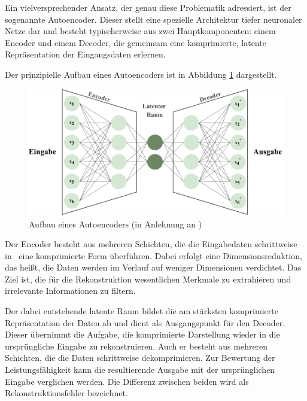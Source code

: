 Ein vielversprechender Ansatz, der genau diese Problematik adressiert, ist der sogenannte Autoencoder. 
Dieser stellt eine spezielle Architektur tiefer neuronaler Netze dar und besteht typischerweise aus zwei Hauptkomponenten: einem Encoder und einem Decoder, die gemeinsam eine komprimierte, latente Repräsentation der Eingangsdaten erlernen.
\cite{Lempitsky2019}

Der prinzipielle Aufbau eines Autoencoders ist in Abbildung \ref{fig:Autoencoder} dargestellt.

\begin{figure}[htbp]
    \centering
    \includegraphics[width=1\textwidth]{Bilder/Autoencoder/AutoencoderModell.pdf}
    \caption[Aufbau eines Autoencoders]{Aufbau eines Autoencoders (in Anlehnung an \cite{AutoencoderBild})}
    \label{fig:Autoencoder}
\end{figure}

\vspace{-0.75em}
Der Encoder besteht aus mehreren Schichten, die die Eingabedaten schrittweise in%
\pagebreak
~eine komprimierte Form überführen. 
Dabei erfolgt eine Dimensionsreduktion, das heißt, die Daten werden im Verlauf auf weniger Dimensionen verdichtet. 
Das Ziel ist, die für die Rekonstruktion wesentlichen Merkmale zu extrahieren und irrelevante Informationen zu filtern.

Der dabei entstehende latente Raum bildet die am stärksten komprimierte Repräsentation der Daten ab und dient als Ausgangspunkt für den Decoder.
Dieser übernimmt die Aufgabe, die komprimierte Darstellung wieder in die ursprüngliche Eingabe zu rekonstruieren. 
Auch er besteht aus mehreren Schichten, die die Daten schrittweise dekomprimieren.
Zur Bewertung der Leistungsfähigkeit kann die resultierende Ausgabe mit der ursprünglichen Eingabe verglichen werden. 
Die Differenz zwischen beiden wird als Rekonstruktionsfehler bezeichnet. \cite{Autoencoder}

